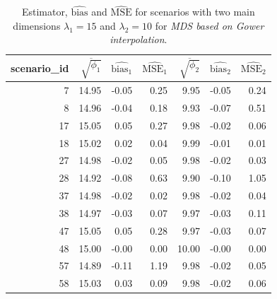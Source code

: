 \documentclass[11pt]{report}
\begin{document}
\begin{table}[ht]
\centering
\begin{tabular}{rrrrrrr}
scenario\_id & $\overline{\sqrt{\phi_1}}$ & $\widehat{\mbox{bias}_1}$ & $\widehat{\mbox{MSE}_1}$ & $\overline{\sqrt{\phi_2}}$ & $\widehat{\mbox{bias}_2}$ & $\widehat{\mbox{MSE}_2}$ \\ 
  \hline
7 & 14.95 & -0.05 & 0.25 & 9.95 & -0.05 & 0.24 \\ 
8 & 14.96 & -0.04 & 0.18 & 9.93 & -0.07 & 0.51 \\ 
17 & 15.05 & 0.05 & 0.27 & 9.98 & -0.02 & 0.06 \\ 
18 & 15.02 & 0.02 & 0.04 & 9.99 & -0.01 & 0.01 \\ 
27 & 14.98 & -0.02 & 0.05 & 9.98 & -0.02 & 0.03 \\ 
28 & 14.92 & -0.08 & 0.63 & 9.90 & -0.10 & 1.05 \\ 
37 & 14.98 & -0.02 & 0.02 & 9.98 & -0.02 & 0.04 \\ 
38 & 14.97 & -0.03 & 0.07 & 9.97 & -0.03 & 0.11 \\ 
47 & 15.05 & 0.05 & 0.28 & 9.97 & -0.03 & 0.07 \\ 
48 & 15.00 & -0.00 & 0.00 & 10.00 & -0.00 & 0.00 \\ 
57 & 14.89 & -0.11 & 1.19 & 9.98 & -0.02 & 0.05 \\ 
58 & 15.03 & 0.03 & 0.09 & 9.98 & -0.02 & 0.06 \\ 
   \hline
\end{tabular}
\caption{Estimator, $\widehat{\mbox{bias}}$ and $\widehat{\mbox{MSE}}$ for scenarios with two main dimensions $\lambda_1 = 15$ and $\lambda_2 = 10$ for \textit{MDS based on Gower interpolation}.}
\end{table}
\end{document}
